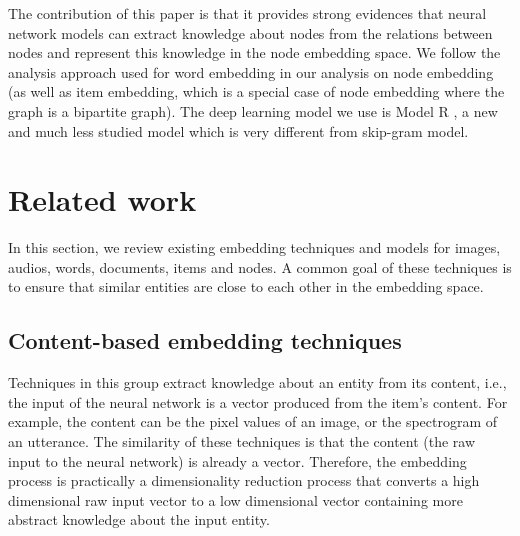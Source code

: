 \documentclass[conference]{IEEEtran}
\begin{document}
The contribution of this paper is that
it provides strong evidences that neural network models can extract
knowledge about nodes from the relations between nodes and
represent this knowledge in the node embedding space.
We follow the analysis approach used for word embedding
in our analysis on node embedding
(as well as item embedding,
which is a special case of node embedding where the graph is a bipartite graph).
The deep learning model we use is Model R \cite{hou2017deep},
a new and much less studied model which is very different from skip-gram model.

\section{Related work}
In this section,
we review existing embedding techniques and models for
images, audios, words, documents, items and nodes.
A common goal of these techniques is to ensure that
similar entities are close to each other in the embedding space.

\subsection{Content-based embedding techniques}
Techniques in this group extract knowledge about an entity from its content, 
i.e., the input of the neural network is a vector produced from the item's content.
For example, the content can be
the pixel values of an image, or the spectrogram of an utterance.
The similarity of these techniques is that the content
(the raw input to the neural network) is already a vector.
Therefore, the embedding process is practically a dimensionality reduction process
that converts a high dimensional raw input vector to a low dimensional vector 
containing more abstract knowledge about the input entity.
\end{document}
